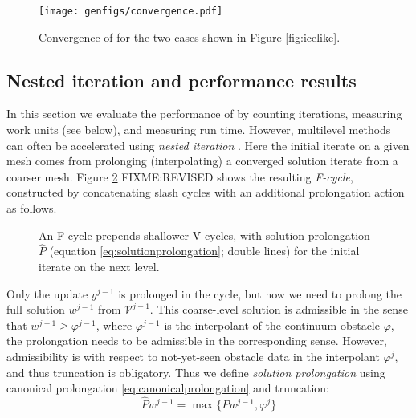 \documentclass[letterpaper,final,12pt,reqno]{amsart}
\theoremstyle{claim}
\numberwithin{equation}{section}
\numberwithin{figure}{section}
\numberwithin{table}{section}
\numberwithin{theorem}{section}
\begin{document}
\begin{figure}
\texttt{[image: genfigs/convergence.pdf]}
\caption{Convergence of  for the two cases shown in Figure \ref{fig:icelike}.}
\label{fig:convergence}
\end{figure}

\subsection*{Nested iteration and performance results}  In this section we evaluate the performance of  by counting iterations, measuring work units (see below), and measuring run time.  However, multilevel methods can often be accelerated using \emph{nested iteration} \cite{Trottenbergetal2001}.  Here the initial iterate on a given mesh comes from prolonging (interpolating) a converged solution iterate from a coarser mesh.  Figure \ref{fig:fcycle} FIXME:REVISED shows the resulting \emph{F-cycle}, constructed by concatenating slash cycles with an additional prolongation action as follows.

\begin{figure}

\caption{An F-cycle prepends shallower V-cycles, with solution prolongation $\hat P$ (equation \eqref{eq:solutionprolongation}; double lines) for the initial iterate on the next level.}
\label{fig:fcycle}
\end{figure}

Only the update $y^{j-1}$ is prolonged in the  cycle, but now we need to prolong the full solution $w^{j-1}$ from $\mathcal{V}^{j-1}$.  This coarse-level solution is admissible in the sense that $w^{j-1} \ge \varphi^{j-1}$, where $\varphi^{j-1}$ is the interpolant of the continuum obstacle $\varphi$, the prolongation needs to be admissible in the corresponding sense.  However, admissibility is with respect to not-yet-seen obstacle data in the interpolant $\varphi^j$, and thus truncation is obligatory.  Thus we define \emph{solution prolongation} using canonical prolongation \eqref{eq:canonicalprolongation} and truncation:
\begin{equation}
\hat P w^{j-1} = \max\{P w^{j-1}, \varphi^{j}\}  \label{eq:solutionprolongation}
\end{equation}
\end{document}
